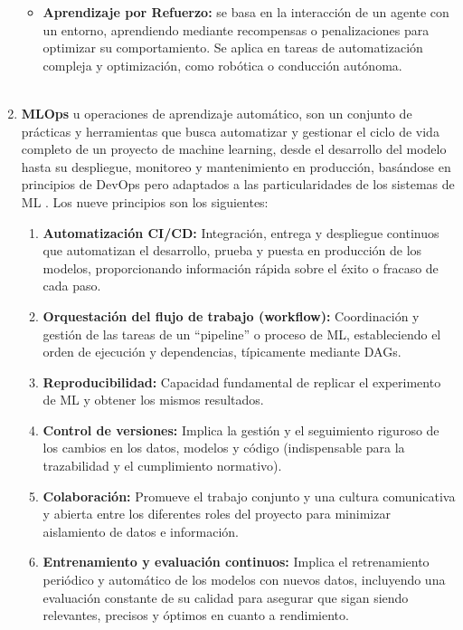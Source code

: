 \begin{enumerate}
\begin{itemize}
		\item \textbf{Aprendizaje por Refuerzo:} se basa en la interacción de un agente con un entorno, aprendiendo mediante recompensas o penalizaciones para optimizar su comportamiento. Se aplica en tareas de automatización compleja y optimización, como robótica o conducción autónoma. \\ \\ 
	\end{itemize}
	
	\item  \textbf{MLOps} \label{def14} u operaciones de aprendizaje automático, son un conjunto de prácticas y herramientas que busca automatizar y gestionar el ciclo de vida completo de un proyecto de machine learning, desde el desarrollo del modelo hasta su despliegue, monitoreo y mantenimiento en producción, basándose en principios de DevOps pero adaptados a las particularidades de los sistemas de ML \citep{Kreuzberger2023MLOps}. Los nueve principios son los siguientes:
	\begin{enumerate}
		\item \textbf{Automatización CI/CD:} Integración, entrega y despliegue continuos que automatizan el desarrollo, prueba y puesta en producción de los modelos, proporcionando información rápida sobre el éxito o fracaso de cada paso.
		
		\item \textbf{Orquestación del flujo de trabajo (workflow):} Coordinación y gestión de las tareas de un ``pipeline'' o proceso de ML, estableciendo el orden de ejecución y dependencias, típicamente mediante DAGs.
		
		\item \textbf{Reproducibilidad:} Capacidad fundamental de replicar el experimento de ML y obtener los mismos resultados.
		
		\item \textbf{Control de versiones:} Implica la gestión y el seguimiento riguroso de los cambios en los datos, modelos y código (indispensable para la trazabilidad y el cumplimiento normativo).
		
		\item \textbf{Colaboración:} Promueve el trabajo conjunto y una cultura comunicativa y abierta entre los diferentes roles del proyecto para minimizar aislamiento de datos e información.
		
		\item \textbf{Entrenamiento y evaluación continuos:} Implica el retrenamiento periódico y automático de los modelos con nuevos datos, incluyendo una evaluación constante de su calidad para asegurar que sigan siendo relevantes, precisos y óptimos en cuanto a rendimiento.
		

\end{enumerate}
\end{enumerate}
